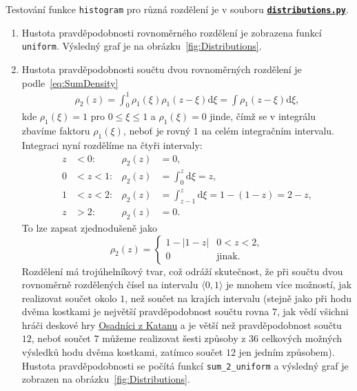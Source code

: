 \documentclass[a4paper,11pt,twoside]{article}
\renewcommand{\d}{\mathrm{d}}           %
\def\abs#1{\left|#1\right|}
\def\code#1{\textnormal{\texttt{#1}}}
\def\ghfile#1#2{\textnormal{\textbf{\texttt{\href{https://github.com/PavelStransky/PCInPhysics/blob/main/#1#2}{#2}}}}}
\theoremstyle{red}
\theoremstyle{green}
\begin{document}
    \begin{solution}
        Testování funkce \code{histogram} pro různá rozdělení je v souboru \ghfile{python/histogram/}{distributions.py}.
        \begin{enumerate}
            \item 
                Hustota pravděpodobnosti rovnoměrného rozdělení je zobrazena funkcí \code{uniform}.
                Výsledný graf je na obrázku~\ref{fig:Distributions}.

            \item
                Hustota pravděpodobnosti součtu dvou rovnoměrných rozdělení je podle~\eqref{eq:SumDensity}
                \begin{align}
                    \rho_{2}(z)
                        =\int_{0}^{1}\rho_{1}(\xi)\rho_{1}(z-\xi)\d\xi
                        =\int\rho_{1}(z-\xi)\d\xi,
                \end{align}
                kde $\rho_{1}(\xi)=1$ pro $0\leq\xi\leq1$ a $\rho_{1}(\xi)=0$ jinde,
                čímž se v integrálu zbavíme faktoru $\rho_{1}(\xi)$, neboť je rovný $1$ na celém integračním intervalu.
                Integraci nyní rozdělíme na čtyři intervaly:
                \begin{align}
                    z&<0: &
                    \rho_{2}(z)&=0,\nonumber\\
                    0&<z<1: &
                    \rho_{2}(z)&=\int_{0}^{z}\d\xi=z,\nonumber\\
                    1&<z<2: &
                    \rho_{2}(z)&=\int_{z-1}^{z}\d\xi=1-(1-z)=2-z,\nonumber\\
                    z&>2: &
                    \rho_{2}(z)&=0.\nonumber
                \end{align}
                To lze zapsat zjednodušeně jako
                \begin{equation}
                    \label{eq:2UniformDistribution}
                    \rho_{2}(z)=\left\{\begin{array}{ll}
                        1-\abs{1-z} & 0<z<2, \\
                        0 & \text{jinak}.
                    \end{array}\right.
                \end{equation}
                Rozdělení má trojúhelníkový tvar, což odráží skutečnost, že při součtu dvou rovnoměrně rozdělených čísel na intervalu $\langle0,1\rangle$ je mnohem více možností, jak realizovat součet okolo $1$, než součet na krajích intervalu (stejně jako při hodu dvěma kostkami je největší pravděpodobnost součtu rovna $7$, jak vědí všichni hráči deskové hry \href{https://cs.wikipedia.org/wiki/Osadn%C3%ADci_z_Katanu}{Osadníci z Katanu}  a je větší než pravděpodobnost součtu $12$, neboť součet $7$ můžeme realizovat šesti způsoby z $36$ celkových možných výsledků hodu dvěma kostkami, zatímco součet $12$ jen jedním způsobem).
                Hustota pravděpodobnosti se počítá funkcí \code{sum_2_uniform} a výsledný graf je zobrazen na obrázku~\ref{fig:Distributions}.
            

\end{enumerate}
\end{solution}
\end{document}
